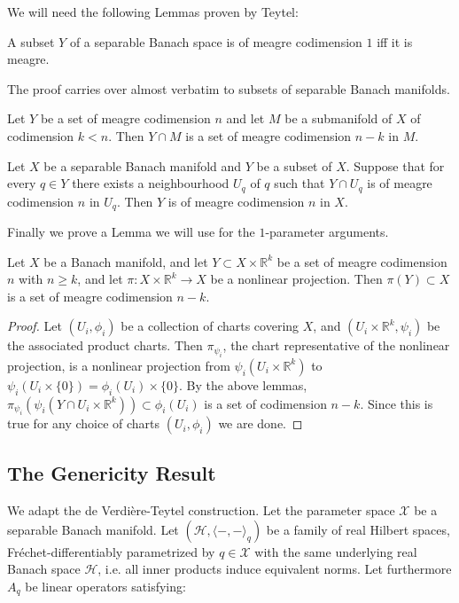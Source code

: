We will need the following Lemmas proven by Teytel:
\begin{lem}{\cite{Teytel1999}}
\label{lemma:meagre}
A subset $Y$ of a separable Banach space is of meagre codimension $1$ iff it is meagre.
\end{lem}
The proof carries over almost verbatim to subsets of separable Banach manifolds. 
\begin{lem}
\label{lem:codimension intersection}{\cite{Teytel1999}}
Let $Y$ be a set of meagre codimension $n$ and let $M$ be a submanifold of $X$ of codimension $k< n$. Then $Y\cap M$ is a set of meagre codimension $n-k$ in $M$.
\end{lem}
\begin{lem}{\cite{Teytel1999}}
\label{lem:meagre codim local reduction}
Let $X$ be a separable Banach manifold and $Y$ be a subset of $X$. Suppose that for every $q\in Y$ there exists a neighbourhood $U_q$ of $q$ such that $Y\cap U_q$ is of meagre codimension $n$ in $U_q$. Then $Y$ is of meagre codimension $n$ in $X$.
\end{lem}
Finally we prove a Lemma we will use for the $1$-parameter arguments.

\begin{lem}
\label{lemma:codimension}
Let $X$ be a Banach manifold, and let $Y\subset X\times \mathbb{R}^k$ be a set of meagre codimension $n$ with $n\geq k$, and let $\pi:X\times \mathbb{R}^k\to X$ be a nonlinear projection. Then $\pi(Y)\subset X$ is a set of meagre codimension $n-k$.
\end{lem}
\begin{proof}
Let $(U_i,\phi_i)$ be a collection of charts covering $X$, and $(U_i\times \mathbb{R}^k,\psi_i)$ be the associated product charts. Then $\pi_{\psi_i}$, the chart representative of the nonlinear projection, is a nonlinear projection from $\psi_i(U_i\times \mathbb{R}^k)$ to $\psi_i(U_i\times \{0\})=\phi_i(U_i)\times \{0\}$. By the above lemmas, $\pi_{\psi_i} (\psi_i(Y\cap U_i\times \mathbb{R}^k))\subset \phi_i (U_i)$ is a set of codimension $n-k$. Since this is true for any choice of charts $(U_i,\phi_i)$ we are done.
\end{proof}


\subsection{The Genericity Result}
\label{subsection:the genericity result}
We adapt the de Verdière-Teytel construction. Let the parameter space $\mathcal{X}$ be a separable Banach manifold. Let $(\mathcal{H},\langle -,-\rangle_q)$ be a family of real Hilbert spaces, Fr\'echet-differentiably parametrized by $q\in\mathcal{X}$ with the same underlying real Banach space $\mathcal{H}$, i.e. all inner products induce equivalent norms. Let furthermore $A_q$ be linear operators satisfying:


